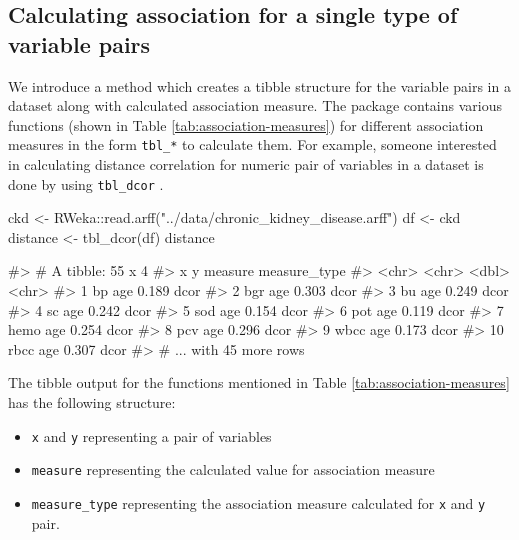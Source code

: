 \hypertarget{calculating-association-for-a-single-type-of-variable-pairs}{%
\subsection{Calculating association for a single type of variable
pairs}\label{calculating-association-for-a-single-type-of-variable-pairs}}

We introduce a method which creates a tibble structure for the variable
pairs in a dataset along with calculated association measure. The
package contains various functions (shown in Table
\ref{tab:association-measures}) for different association measures in
the form \texttt{tbl\_*} to calculate them. For example, someone
interested in calculating distance correlation for numeric pair of
variables in a dataset is done by using \texttt{tbl\_dcor} .

\begin{Schunk}
\begin{Sinput}
ckd <- RWeka::read.arff("../data/chronic_kidney_disease.arff")
df <- ckd
distance <- tbl_dcor(df)
distance
\end{Sinput}
\begin{Soutput}
#> # A tibble: 55 x 4
#>    x     y     measure measure_type
#>    <chr> <chr>   <dbl> <chr>       
#>  1 bp    age     0.189 dcor        
#>  2 bgr   age     0.303 dcor        
#>  3 bu    age     0.249 dcor        
#>  4 sc    age     0.242 dcor        
#>  5 sod   age     0.154 dcor        
#>  6 pot   age     0.119 dcor        
#>  7 hemo  age     0.254 dcor        
#>  8 pcv   age     0.296 dcor        
#>  9 wbcc  age     0.173 dcor        
#> 10 rbcc  age     0.307 dcor        
#> # ... with 45 more rows
\end{Soutput}
\end{Schunk}

The tibble output for the functions mentioned in Table
\ref{tab:association-measures} has the following structure:

\begin{itemize}
\tightlist
\item
  \texttt{x} and \texttt{y} representing a pair of variables
\item
  \texttt{measure} representing the calculated value for association
  measure
\item
  \texttt{measure\_type} representing the association measure calculated
  for \texttt{x} and \texttt{y} pair.
\end{itemize}

